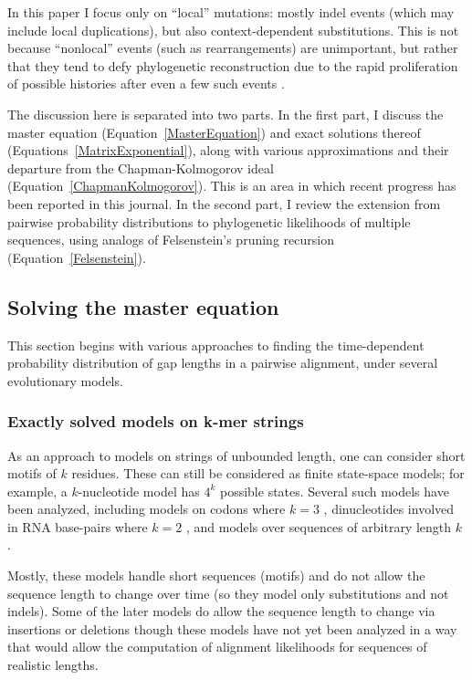 \documentclass{bmcart}
\newcommand{\eqref}[1]{Equation~\ref{#1}}
\begin{document}
In this paper I focus only on ``local'' mutations: mostly indel events (which may include local duplications),
but also context-dependent substitutions.
This is not because ``nonlocal'' events (such as rearrangements) are unimportant,
but rather that they tend to defy phylogenetic reconstruction due to the rapid proliferation of possible histories
after even a few such events \cite{pmid9773350}.

The discussion here is separated into two parts.
In the first part, I discuss
the master equation (\eqref{MasterEquation})
and exact solutions thereof (Equations~\ref{MatrixExponential}),
along with various approximations and their departure from the Chapman-Kolmogorov ideal (\eqref{ChapmanKolmogorov}).
This is an area in which recent progress has been reported in this journal.
In the second part, I review
the extension from pairwise probability distributions
to phylogenetic likelihoods of multiple sequences,
using analogs of Felsenstein's pruning recursion (\eqref{Felsenstein}).

\subsection*{Solving the master equation}

This section begins with various approaches to finding the time-dependent probability distribution
of gap lengths in a pairwise alignment,
under several evolutionary models.

\subsubsection*{Exactly solved models on k-mer strings}

As an approach to models on strings of unbounded length, one can consider short motifs of $k$ residues.
These can still be considered as finite state-space models;
for example, a $k$-nucleotide model has $4^k$ possible states.
Several such models have been analyzed, including models on codons where $k=3$
\cite{pmid8281128,pmid7968486},
dinucleotides involved in RNA base-pairs where $k=2$ \cite{pmid7475089,KnudsenHein99,pmid17884102},
and models over sequences of arbitrary length $k$ \cite{LunterHein04,pmid26135206}.

Mostly, these models handle short sequences (motifs) and do not allow the sequence length to change over time
(so they model only substitutions and not indels).
Some of the later models do allow the sequence length to change via insertions or deletions
\cite{pmid26135206} though these models have not yet been analyzed in a way that would allow the
computation of alignment likelihoods for sequences of realistic lengths.
\end{document}

